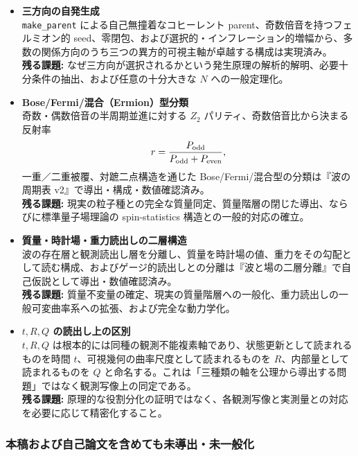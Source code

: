 \documentclass[
  a4paper,
]{ltjsarticle}
\begin{document}
\begin{itemize}
\item
  \textbf{三方向の自発生成}\\
  \texttt{make\_parent} による自己無撞着なコヒーレント
  parent、奇数倍音を持つフェルミオン的
  seed、零閉包、および選択的・インフレーション的増幅から、多数の関係方向のうち三つの異方的可視主軸が卓越する構成は実現済み。\\
  \textbf{残る課題:}
  なぜ三方向が選択されるかという発生原理の解析的解明、必要十分条件の抽出、および任意の十分大きな
  \(N\) への一般定理化。
\item
  \textbf{Bose/Fermi/混合（Ermion）型分類}\\
  奇数・偶数倍音の半周期並進に対する \(Z_2\)
  パリティ、奇数倍音比から決まる反射率 \[
  r=\frac{P_{\rm odd}}{P_{\rm odd}+P_{\rm even}},
  \] 一重／二重被覆、対蹠二点構造を通じた
  Bose/Fermi/混合型の分類は『波の周期表
  v2』で導出・構成・数値確認済み。\\
  \textbf{残る課題:}
  現実の粒子種との完全な質量同定、質量階層の閉じた導出、ならびに標準量子場理論の
  spin-statistics 構造との一般的対応の確立。
\item
  \textbf{質量・時計場・重力読出しの二層構造}\\
  波の存在層と観測読出し層を分離し、質量を時計場の値、重力をその勾配として読む構成、およびゲージ的読出しとの分離は『波と場の二層分離』で自己仮説として導出・数値確認済み。\\
  \textbf{残る課題:}
  質量不変量の確定、現実の質量階層への一般化、重力読出しの一般可変曲率系への拡張、および完全な動力学化。
\item
  \textbf{\(t,R,Q\) の読出し上の区別}\\
  \(t,R,Q\)
  は根本的には同種の観測不能複素軸であり、状態更新として読まれるものを時間
  \(t\)、可視幾何の曲率尺度として読まれるものを
  \(R\)、内部量として読まれるものを \(Q\)
  と命名する。これは「三種類の軸を公理から導出する問題」ではなく観測写像上の同定である。\\
  \textbf{残る課題:}
  原理的な役割分化の証明ではなく、各観測写像と実測量との対応を必要に応じて精密化すること。
\end{itemize}

\subsubsection{本稿および自己論文を含めても未導出・未一般化}\label{ux672cux7a3fux304aux3088ux3073ux81eaux5df1ux8ad6ux6587ux3092ux542bux3081ux3066ux3082ux672aux5c0eux51faux672aux4e00ux822cux5316}
\end{document}
